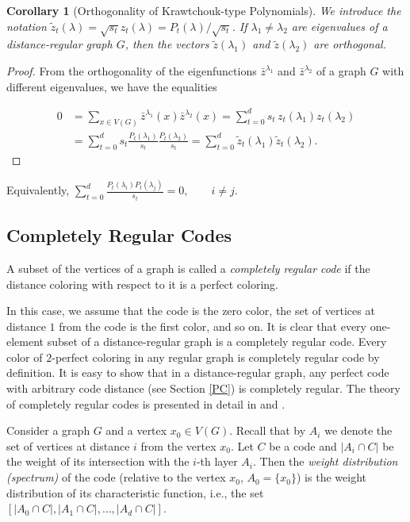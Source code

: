 \documentclass[11pt]{article}
\newtheorem{corollary}{Corollary}[section]
\theoremstyle{definition}
\begin{document}
{{{\begin{corollary}[Orthogonality of Krawtchouk-type Polynomials]
We introduce the notation
$\widetilde{z}_t(\lambda)=\sqrt{s_t}z_t(\lambda)=P_t(\lambda)/\sqrt{s_t}$.
If $\lambda_1\neq \lambda_2$
are eigenvalues of a distance-regular graph $G$, then the vectors
$\widetilde{z}(\lambda_1)$ and $\widetilde{z}(\lambda_2)$
are orthogonal.
\end{corollary}
\begin{proof}
From the orthogonality of the eigenfunctions $\bar{z}^{\lambda_1}$ and
$\bar{z}^{\lambda_2}$ of a graph $G$ with different eigenvalues, we have the equalities

\begin{align*}
0
&=
\sum_{x\in V(G)}
\bar z^{\lambda_1}(x)\bar z^{\lambda_2}(x)
=
\sum_{t=0}^d
s_t\,z_t(\lambda_1)z_t(\lambda_2)
\\
&=
\sum_{t=0}^d
s_t
\frac{P_t(\lambda_1)}{s_t}
\frac{P_t(\lambda_2)}{s_t}
=
\sum_{t=0}^d
\widetilde z_t(\lambda_1)
\widetilde z_t(\lambda_2).
\end{align*}
\end{proof}

Equivalently,
$
\sum_{t=0}^d
\frac{P_t(\lambda_i)P_t(\lambda_j)}{s_t}
=0,
\qquad i\neq j.
$

\subsection{Completely Regular Codes}\label{4.5}

A subset of the vertices of a graph is called a {\sl completely regular code}
if the distance coloring with respect to it
is a perfect coloring.  

In this case, we assume that the code is the zero
color, the set of vertices at distance $1$ from the code is the first color,
and so on. It is clear that every one-element subset of a distance-regular graph is a completely regular code.
Every color of  $2$-perfect coloring in any regular graph is completely
regular code by definition. It is easy to show that in a
distance-regular graph, any perfect code with arbitrary
code distance (see Section \ref{PC}) is completely regular.
The theory of completely regular codes is presented in detail in \cite{Koolen} and \cite{CRC}.

{
Consider a graph $G$ and a vertex $x_0\in V(G)$. Recall that by $A_i$
we denote the set of vertices at distance $i$ from the vertex
$x_0$. Let $C$
be a code and $|A_i\cap C|$
be the weight of its intersection with the $i$-th layer $A_i$. Then the {\sl weight
distribution (spectrum)} of the code (relative to the vertex $x_0$,
$A_0=\{x_0\}$) is the weight distribution of its
characteristic function, i.e., the set $[|A_0 \cap C|, |A_1 \cap
C|, \ldots, |A_d \cap C|]$.}

}}}
\end{document}
